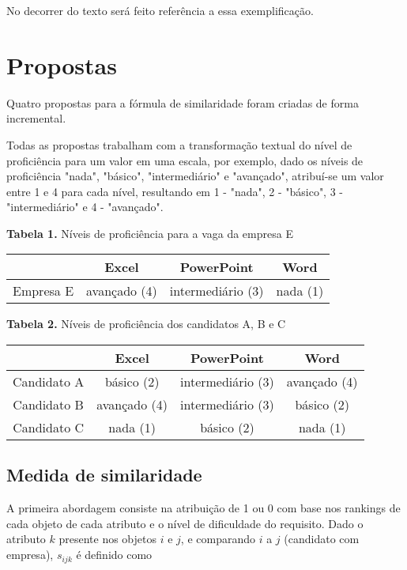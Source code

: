 \documentclass[]{article}
\begin{document}
	No decorrer do texto será feito referência a essa exemplificação.
	
	\section{Propostas}
	
	Quatro propostas para a fórmula de similaridade foram criadas de forma incremental.
	
	Todas as propostas trabalham com a transformação textual do nível de proficiência para um valor em uma escala, por exemplo, dado os níveis de proficiência "nada", "básico", "intermediário" e "avançado", atribuí-se um valor entre 1 e 4 para cada nível, resultando em 1 - "nada", 2 - "básico", 3 - "intermediário" e 4 - "avançado".
	
	\begin{center}
		\noindent \textbf{Tabela 1.}
		\noindent Níveis de proficiência para a vaga da empresa E
		
		\begin{tabular}{| c | c |c | c|} 
			\hline
			& Excel & PowerPoint & Word \\ [0.5ex] 
			\hline
			Empresa E & avançado (4) & intermediário (3) & nada (1) \\
			\hline
		\end{tabular}
	\end{center}
	
	\begin{center}
		\noindent \textbf{Tabela 2.}
		\noindent Níveis de proficiência dos candidatos A, B e C
		
		\begin{tabular}{|c | c | c | c|} 
			\hline
			& Excel & PowerPoint & Word \\ [0.5ex] 
			\hline
			Candidato A & básico (2) & intermediário (3) & avançado (4) \\
			\hline
			Candidato B & avançado (4) & intermediário (3) & básico (2) \\
			\hline
			Candidato C & nada (1) & básico (2) & nada (1) \\
			\hline
		\end{tabular}
	\end{center}
	
	\subsection{Medida de similaridade}
	A primeira abordagem consiste na atribuição de 1 ou 0 com base nos rankings de cada objeto de cada atributo e o nível de dificuldade do requisito. Dado o atributo $k$ presente nos objetos $i$ e $j$, e comparando $i$ a $j$ (candidato com empresa), $s_{ijk}$ é definido como
	
\end{document}
